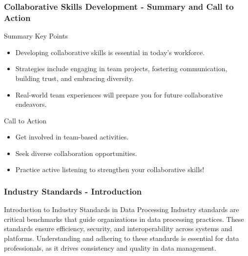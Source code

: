 \documentclass[aspectratio=169]{beamer}
\begin{document}
\begin{frame}[fragile]
    \frametitle{Collaborative Skills Development - Summary and Call to Action}
    \begin{block}{Summary Key Points}
        \begin{itemize}
            \item Developing collaborative skills is essential in today’s workforce.
            \item Strategies include engaging in team projects, fostering communication, building trust, and embracing diversity.
            \item Real-world team experiences will prepare you for future collaborative endeavors.
        \end{itemize}
    \end{block}

    \begin{block}{Call to Action}
        \begin{itemize}
            \item Get involved in team-based activities.
            \item Seek diverse collaboration opportunities.
            \item Practice active listening to strengthen your collaborative skills!
        \end{itemize}
    \end{block}
\end{frame}

\begin{frame}[fragile]
    \frametitle{Industry Standards - Introduction}
    \begin{block}{Introduction to Industry Standards in Data Processing}
        Industry standards are critical benchmarks that guide organizations in data processing practices. 
        These standards ensure efficiency, security, and interoperability across systems and platforms.
        Understanding and adhering to these standards is essential for data professionals, as it drives consistency and quality in data management.
    \end{block}
\end{frame}
\end{document}
